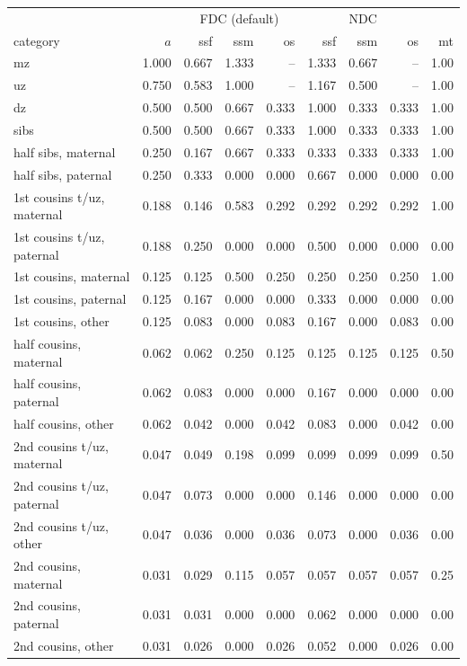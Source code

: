 \begin{tabular}{lr|rrr|rrr|r}\toprule
 & & \multicolumn{3}{c|}{FDC (default)} & \multicolumn{3}{c|}{NDC} & \\
category & $a$ & ssf & ssm & os & ssf & ssm & os & mt\\\midrule
mz & 1.000 & 0.667 & 1.333 & -- & 1.333 & 0.667 & -- & 1.00 \\
uz & 0.750 & 0.583 & 1.000 & -- & 1.167 & 0.500 & -- & 1.00 \\
dz & 0.500 & 0.500 & 0.667 & 0.333 & 1.000 & 0.333 & 0.333 & 1.00 \\
sibs & 0.500 & 0.500 & 0.667 & 0.333 & 1.000 & 0.333 & 0.333 & 1.00 \\
half sibs, maternal & 0.250 & 0.167 & 0.667 & 0.333 & 0.333 & 0.333 & 0.333 & 1.00 \\
half sibs, paternal & 0.250 & 0.333 & 0.000 & 0.000 & 0.667 & 0.000 & 0.000 & 0.00 \\
1st cousins t/uz, maternal & 0.188 & 0.146 & 0.583 & 0.292 & 0.292 & 0.292 & 0.292 & 1.00 \\
1st cousins t/uz, paternal & 0.188 & 0.250 & 0.000 & 0.000 & 0.500 & 0.000 & 0.000 & 0.00 \\
1st cousins, maternal & 0.125 & 0.125 & 0.500 & 0.250 & 0.250 & 0.250 & 0.250 & 1.00 \\
1st cousins, paternal & 0.125 & 0.167 & 0.000 & 0.000 & 0.333 & 0.000 & 0.000 & 0.00 \\
1st cousins, other & 0.125 & 0.083 & 0.000 & 0.083 & 0.167 & 0.000 & 0.083 & 0.00 \\
half cousins, maternal & 0.062 & 0.062 & 0.250 & 0.125 & 0.125 & 0.125 & 0.125 & 0.50 \\
half cousins, paternal & 0.062 & 0.083 & 0.000 & 0.000 & 0.167 & 0.000 & 0.000 & 0.00 \\
half cousins, other & 0.062 & 0.042 & 0.000 & 0.042 & 0.083 & 0.000 & 0.042 & 0.00 \\
2nd cousins t/uz, maternal & 0.047 & 0.049 & 0.198 & 0.099 & 0.099 & 0.099 & 0.099 & 0.50 \\
2nd cousins t/uz, paternal & 0.047 & 0.073 & 0.000 & 0.000 & 0.146 & 0.000 & 0.000 & 0.00 \\
2nd cousins t/uz, other & 0.047 & 0.036 & 0.000 & 0.036 & 0.073 & 0.000 & 0.036 & 0.00 \\
2nd cousins, maternal & 0.031 & 0.029 & 0.115 & 0.057 & 0.057 & 0.057 & 0.057 & 0.25 \\
2nd cousins, paternal & 0.031 & 0.031 & 0.000 & 0.000 & 0.062 & 0.000 & 0.000 & 0.00 \\
2nd cousins, other & 0.031 & 0.026 & 0.000 & 0.026 & 0.052 & 0.000 & 0.026 & 0.00 \\
\bottomrule\end{tabular}
